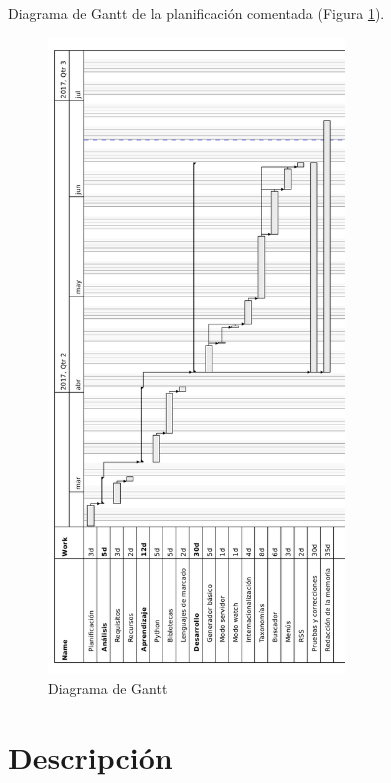 \documentclass[a4paper,12pt]{article}
\begin{document}
\paragraph{}
Diagrama de Gantt de la planificación comentada (Figura \ref{fig:gantt}).

\begin{figure}[htbp]
    \centering
    \includegraphics[width=0.7\textwidth]{img/diagrama_gantt}
    \caption{Diagrama de Gantt}
    \label{fig:gantt}
\end{figure}


\section{Descripción}
\end{document}
